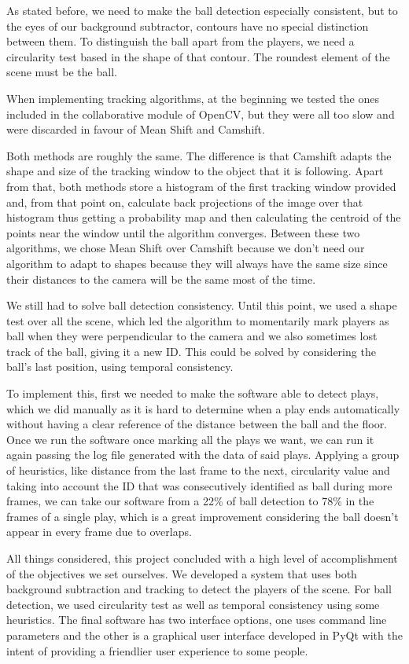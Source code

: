 As stated before, we need to make the ball detection especially consistent, but to the eyes of our background subtractor, contours have no special distinction between them. To distinguish the ball apart from the players, we need a circularity test based in the shape of that contour. The roundest element of the scene must be the ball.

When implementing tracking algorithms, at the beginning we tested the ones included in the collaborative module of OpenCV, but they were all too slow and were discarded in favour of Mean Shift and Camshift. 

Both methods are roughly the same. The difference is that Camshift adapts the shape and size of the tracking window to the object that it is following. Apart from that, both methods store a histogram of the first tracking window provided and, from that point on, calculate back projections of the image over that histogram thus getting a probability map and then calculating the centroid of the points near the window until the algorithm converges. Between these two algorithms, we chose Mean Shift over Camshift because we don’t need our algorithm to adapt to shapes because they will always have the same size since their distances to the camera will be the same most of the time.

We still had to solve ball detection consistency. Until this point, we used a shape test over all the scene, which led the algorithm to momentarily mark players as ball when they were perpendicular to the camera and we also sometimes lost track of the ball, giving it a new ID. This could be solved by considering the ball’s last position, using temporal consistency. 

To implement this, first we needed to make the software able to detect plays, which we did manually as it is hard to determine when a play ends automatically without having a clear reference of the distance between the ball and the floor. Once we run the software once marking all the plays we want, we can run it again passing the log file generated with the data of said plays. Applying a group of heuristics, like distance from the last frame to the next, circularity value and taking into account the ID that was consecutively identified as ball during more frames, we can take our software from a 22\% of ball detection to 78\% in the frames of a single play, which is a great improvement considering the ball doesn’t appear in every frame due to overlaps.

All things considered, this project concluded with a high level of accomplishment of the objectives we set ourselves. We developed a system that uses both background subtraction and tracking to detect the players of the scene. For ball detection, we used circularity test as well as temporal consistency using some heuristics. The final software has two interface options, one uses command line parameters and the other is a graphical user interface developed in PyQt with the intent of providing a friendlier user experience to some people.

